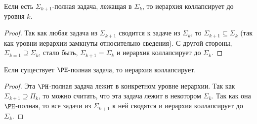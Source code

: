 	\begin{conseq}
		Если есть $\Sigma_{k+1}$-полная задача, лежащая в $\Sigma_k$, то иерархия коллапсирует до уровня $k$.
	\end{conseq}
	\begin{proof}
		Так как любая задача из $\Sigma_{k+1}$ сводится к задаче из $\Sigma_k$, то $\Sigma_{k+1} \subseteq \Sigma_k$
		(так как уровни иерархии замкнуты относительно сведения).
		С другой стороны, $\Sigma_{k=1} \supseteq \Sigma_k$, стало быть, $\Sigma_{k+1} = \Sigma_k$ и иерархия коллапсирует до $\Sigma_k$.
	\end{proof}

	\begin{conseq}
		Если существует $\PH$-полная задача, то иерархия коллапсирует.
	\end{conseq}
	\begin{proof}
		Эта $\PH$-полная задача лежит в конкретном уровне иерархии.
		Так как $\Sigma_{k+1}\supseteq \Pi_k$, то можно считать, что эта задача лежит в некотором $\Sigma_k$.
		Так как она $\PH$-полная, то все задачи из $\Sigma_{k+1}$ к ней сводятся и иерархия коллапсирует до $\Sigma_k$.
	\end{proof}
